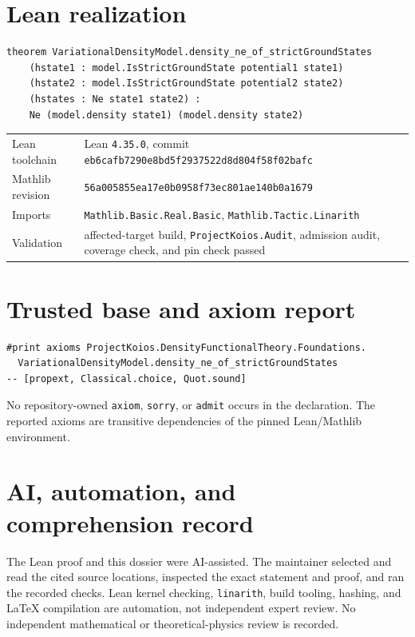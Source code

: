 \section{Lean realization}
\begin{lstlisting}
theorem VariationalDensityModel.density_ne_of_strictGroundStates
    (hstate1 : model.IsStrictGroundState potential1 state1)
    (hstate2 : model.IsStrictGroundState potential2 state2)
    (hstates : Ne state1 state2) :
    Ne (model.density state1) (model.density state2)
\end{lstlisting}
\begin{tabularx}{\textwidth}{@{}lY@{}}
\toprule
Lean toolchain & Lean \texttt{4.35.0}, commit \texttt{eb6cafb7290e8bd5f2937522d8d804f58f02bafc} \\
Mathlib revision & \texttt{56a005855ea17e0b0958f73ec801ae140b0a1679} \\
Imports & \texttt{Mathlib.Basic.Real.Basic}, \texttt{Mathlib.Tactic.Linarith} \\
Validation & affected-target build, \texttt{ProjectKoios.Audit}, admission audit, coverage check, and pin check passed \\
\bottomrule
\end{tabularx}

\section{Trusted base and axiom report}
\begin{lstlisting}
#print axioms ProjectKoios.DensityFunctionalTheory.Foundations.
  VariationalDensityModel.density_ne_of_strictGroundStates
-- [propext, Classical.choice, Quot.sound]
\end{lstlisting}
No repository-owned \texttt{axiom}, \texttt{sorry}, or \texttt{admit} occurs in the declaration.
The reported axioms are transitive dependencies of the pinned Lean/Mathlib environment.

\section{AI, automation, and comprehension record}
The Lean proof and this dossier were AI-assisted.  The maintainer selected and read the cited
source locations, inspected the exact statement and proof, and ran the recorded checks.  Lean
kernel checking, \texttt{linarith}, build tooling, hashing, and LaTeX compilation are automation,
not independent expert review.  No independent mathematical or theoretical-physics review is
recorded.

